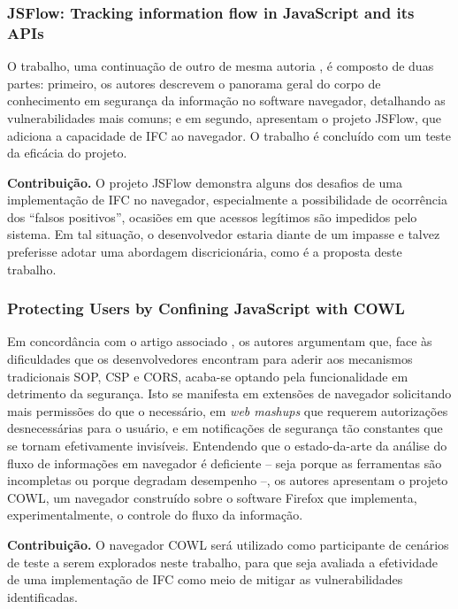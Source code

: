 \subsubsection{JSFlow: Tracking information flow in JavaScript and its APIs \cite{Hedin2014}}
O trabalho, uma continuação de outro de mesma autoria \cite{Hedin2012}, é composto de duas partes: primeiro, os autores descrevem o panorama geral do corpo de conhecimento em segurança da informação no software navegador, detalhando as vulnerabilidades mais comuns; e em segundo, apresentam o projeto JSFlow, que adiciona a capacidade de IFC ao navegador. O trabalho é concluído com um teste da eficácia do projeto.

\textbf{Contribuição.} O projeto JSFlow demonstra alguns dos desafios de uma implementação de IFC no navegador, especialmente a possibilidade de ocorrência dos ``falsos positivos'', ocasiões em que acessos legítimos são impedidos pelo sistema. Em tal situação, o desenvolvedor estaria diante de um impasse e talvez preferisse adotar uma abordagem discricionária, como é a proposta deste trabalho.


\subsubsection{Protecting Users by Confining JavaScript with COWL \cite{Stefan2014}}
Em concordância com o artigo associado \cite{Yang2013}, os autores argumentam que, face às dificuldades que os desenvolvedores encontram para aderir aos mecanismos tradicionais SOP, CSP e CORS, acaba-se optando pela funcionalidade em detrimento da segurança. Isto se manifesta em extensões de navegador solicitando mais permissões do que o necessário, em \textit{web mashups} que requerem autorizações desnecessárias para o usuário, e em notificações de segurança tão constantes que se tornam efetivamente invisíveis. Entendendo que o estado-da-arte da análise do fluxo de informações em navegador é deficiente -- seja porque as ferramentas são incompletas ou porque degradam desempenho --, os autores apresentam o projeto COWL, um navegador construído sobre o software Firefox que implementa, experimentalmente, o controle do fluxo da informação.

\textbf{Contribuição.} O navegador COWL será utilizado como participante de cenários de teste a serem explorados neste trabalho, para que seja avaliada a efetividade de uma implementação de IFC como meio de mitigar as vulnerabilidades identificadas.



